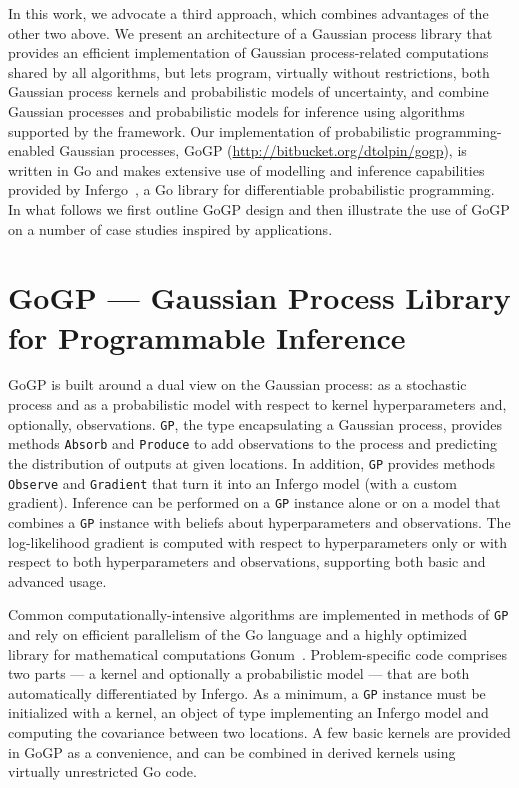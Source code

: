 \documentclass[sigplan,review]{acmart}\settopmatter{printfolios=true,printccs=false,printacmref=false}
\begin{document}
In this work, we advocate a third approach, which combines
advantages of the other two above. We present an architecture of
a Gaussian process library that provides an efficient
implementation of Gaussian process-related computations shared
by all algorithms, but lets program, virtually without
restrictions, both Gaussian process kernels and probabilistic
models of uncertainty, and combine Gaussian processes and
probabilistic models for inference using algorithms supported by
the framework. Our implementation of probabilistic
programming-enabled Gaussian processes, GoGP
(\url{http://bitbucket.org/dtolpin/gogp}), is written in Go
and makes extensive use of modelling and inference capabilities
provided by Infergo~\cite{}, a Go library for differentiable
probabilistic programming. In what follows we first outline GoGP
design  and then illustrate the use of GoGP on a number of case
studies inspired by applications.

\section{GoGP --- Gaussian Process Library for Programmable Inference}

GoGP is built around a dual view on the Gaussian process: as a
stochastic process and as a probabilistic model with respect
to kernel hyperparameters and, optionally, observations.
\lstinline{GP}, the type encapsulating a Gaussian process,
provides methods \lstinline{Absorb} and \lstinline{Produce} to 
add observations to the process and predicting the distribution
of outputs at given locations. In addition, \lstinline{GP}
provides methods \lstinline{Observe} and \lstinline{Gradient}
that turn it into an Infergo model (with a custom gradient).
Inference can be performed on a \lstinline{GP} instance alone
or on a model that combines a \lstinline{GP} instance with
beliefs about hyperparameters and observations.  The
log-likelihood gradient is computed with respect to
hyperparameters only or with respect to both hyperparameters and
observations, supporting both basic and advanced usage.

Common computationally-intensive algorithms are implemented in 
methods of \lstinline{GP} and rely on efficient parallelism of
the Go language and a highly optimized library for mathematical 
computations Gonum~\cite{}. Problem-specific code comprises two
parts --- a kernel and optionally a probabilistic model --- that
are both automatically differentiated by Infergo.  As a minimum,
a \lstinline{GP} instance must be initialized with a kernel, an
object of type implementing an Infergo model and computing the
covariance between two locations. A few basic kernels are
provided in GoGP as a convenience, and can be combined in derived
kernels using virtually unrestricted Go code. 
\end{document}
